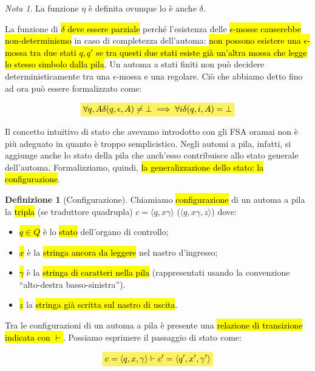 \documentclass[a4paper,11pt,oneside]{article}
\theoremstyle{plain}
\theoremstyle{definition}
\newtheorem{defn}{Definizione}[section]
\theoremstyle{remark}
\newtheorem*{nota}{Nota}
\newcommand{\mhl}[1]{\colorbox{hlcolor}{$\displaystyle #1$}}
\begin{document}
\begin{nota}
  La funzione $\eta$ è definita ovunque lo è anche $\delta$.
\end{nota}

La funzione di \hl{$\delta$ deve essere parziale} perché l'esistenza delle
\hl{$\epsilon$-mosse causerebbe non-determinismo} in caso di completezza
dell'automa: \hl{non possono esistere una $\epsilon$-mossa tra due stati $q, q'$
se tra questi due stati esiste già un'altra mossa che legge lo stesso simbolo
dalla pila}. Un automa a stati finiti non può decidere deterministicamente tra
una $\epsilon$-mossa e una regolare. Ciò che abbiamo detto fino ad ora può
essere formalizzato come:

\begin{equation}
  \mhl{
  \forall q, A \delta(q, \epsilon, A) \neq \bot \implies
    \forall i \delta(q,i,A) = \bot
  }
\end{equation}

Il concetto intuitivo di stato che avevamo introdotto con gli FSA oramai non è
più adeguato in quanto è troppo semplicistico. Negli automi a pila, infatti, si
aggiunge anche lo stato della pila che anch'esso contribuisce allo stato
generale dell'automa. Formalizziamo, quindi, \hl{la generalizzazione dello
stato: la configurazione}.

\begin{defn}[Configurazione]\label{def:configurazione}
  Chiamiamo \hl{configurazione} di un automa a pila la \hl{tripla} (se traduttore
  quadrupla) $c = \langle q, x \gamma \rangle$
  ($\langle q, x \gamma, z \rangle$) dove:

  \begin{itemize}
    \item \hl{$q \in Q$} è lo \hl{stato} dell'organo di controllo;
    \item \hl{$x$} è la \hl{stringa ancora da leggere} nel nastro d'ingresso;
    \item \hl{$\gamma$} è la \hl{stringa di caratteri nella pila} (rappresentati
      usando la convenzione ``alto-destra basso-sinistra'').
    \item \hl{$z$} la \hl{stringa già scritta sul nastro di uscita}.
  \end{itemize}
\end{defn}

Tra le configurazioni di un automa a pila è presente una \hl{relazione di
transizione indicata con $\vdash$}. Possiamo esprimere il passaggio di stato
come:

\begin{equation}
  \mhl{
  c = \langle q, x, \gamma \rangle \vdash c' = \langle q', x', \gamma' \rangle
  }
\end{equation}
\end{document}
